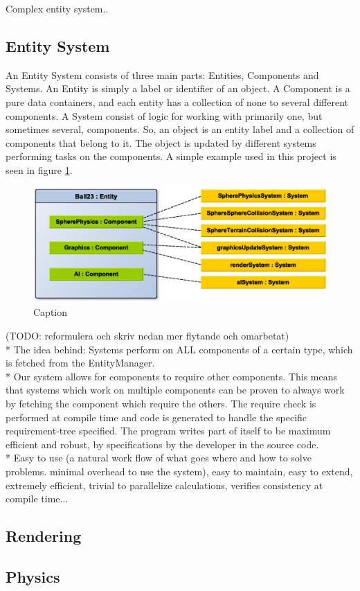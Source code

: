 Complex entity system..

\subsection{Entity System}
An Entity System consists of three main parts: Entities, Components and Systems.
An Entity is simply a label or identifier of an object. A Component is a pure data containers, and each entity has a collection of none to several different components. A System consist of logic for working with primarily one, but sometimes several, components. So, an object is an entity label and a collection of components that belong to it. The object is updated by different systems performing tasks on the components. A simple example used in this project is seen in figure \ref{fig:EntityComponentSystemExample}. 
\begin{figure}[H]
  \centering
  \includegraphics[width=0.9\linewidth]{images/EntityComponentSystemExample.eps}
  \caption{Caption}
  \label{fig:EntityComponentSystemExample}
\end{figure}
(TODO: reformulera och skriv nedan mer flytande och omarbetat)\\
* The idea behind: Systems perform on ALL components of a certain type, which is fetched from the EntityManager.\\
* Our system allows for components to require other components. This means that systems which work on multiple components can be proven to always work by fetching the component which require the others. The require check is performed at compile time and code is generated to handle the specific requirement-tree specified. The program writes part of itself to be maximum efficient and robust, by specifications by the developer in the source code.\\
* Easy to use (a natural work flow of what goes where and how to solve problems. minimal overhead to use the system), easy to maintain, easy to extend, extremely efficient, trivial to parallelize calculations, verifies consistency at compile time...

\subsection{Rendering}

\subsection{Physics}

